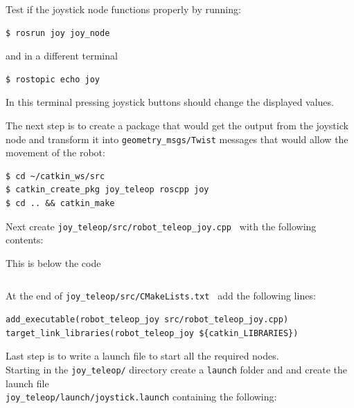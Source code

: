 \noindent Test if the joystick node functions properly by running:
\begin{mdframed}[backgroundcolor=light-gray, linecolor=light-gray]
\begin{verbatim}
$ rosrun joy joy_node
\end{verbatim}
\end{mdframed}

\noindent and in  a different terminal
\begin{mdframed}[backgroundcolor=light-gray, linecolor=light-gray]
\begin{verbatim}
$ rostopic echo joy
\end{verbatim}
\end{mdframed}

\noindent In this terminal pressing joystick buttons should change the displayed values.

The next step is to create a package that would get the output from the joystick node and transform it into \texttt{geometry\_msgs/Twist} messages that would allow the movement of the robot:
\begin{mdframed}[backgroundcolor=light-gray, linecolor=light-gray]
\begin{verbatim}
$ cd ~/catkin_ws/src
$ catkin_create_pkg joy_teleop roscpp joy
$ cd .. && catkin_make
\end{verbatim}
\end{mdframed}

\noindent Next create \texttt{joy\_teleop/src/robot\_teleop\_joy.cpp } with the following contents:

\begin{listing}[H]
    \caption{This is below the code}
    \inputminted[breaklines, linenos,frame=single]{cpp}{ROS/src/robotTeleopJoy.cpp}
    \label{lst:the-code}
\end{listing}

\noindent At the end of \texttt{joy\_teleop/src/CMakeLists.txt } add the following lines:
\begin{verbatim}
add_executable(robot_teleop_joy src/robot_teleop_joy.cpp)
target_link_libraries(robot_teleop_joy ${catkin_LIBRARIES})
\end{verbatim}

\noindent Last step is to write a launch file to start all the required nodes.\\ 
Starting in the \texttt{joy\_teleop/} directory create a \texttt{launch} folder and and create the launch file \\
\texttt{joy\_teleop/launch/joystick.launch} containing the following:

